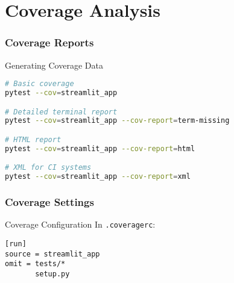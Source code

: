 \documentclass{beamer}
\begin{document}
\section{Coverage Analysis}
\begin{frame}[fragile]
    \frametitle{Coverage Reports}
    \begin{block}{Generating Coverage Data}
        \begin{lstlisting}[language=bash]
# Basic coverage
pytest --cov=streamlit_app

# Detailed terminal report
pytest --cov=streamlit_app --cov-report=term-missing

# HTML report
pytest --cov=streamlit_app --cov-report=html

# XML for CI systems
pytest --cov=streamlit_app --cov-report=xml
        \end{lstlisting}
    \end{block}
\end{frame}

\begin{frame}[fragile]
    \frametitle{Coverage Settings}
    \begin{alertblock}{Coverage Configuration}
        In \texttt{.coveragerc}:
        \begin{lstlisting}[style=configstyle]
[run]
source = streamlit_app
omit = tests/*
       setup.py
        \end{lstlisting}
    \end{alertblock}
\end{frame}
\end{document}
